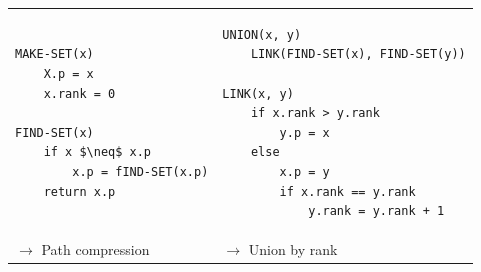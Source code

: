 \begin{center}
\begin{tabular}{m{7cm}m{7cm}}
    \begin{lstlisting}[mathescape]
MAKE-SET(x)
    X.p = x
    x.rank = 0

FIND-SET(x)
    if x $\neq$ x.p
        x.p = fIND-SET(x.p)
    return x.p
    \end{lstlisting}
    &
    \begin{lstlisting}[mathescape]
UNION(x, y)
    LINK(FIND-SET(x), FIND-SET(y))

LINK(x, y)
    if x.rank > y.rank
        y.p = x
    else 
        x.p = y
        if x.rank == y.rank
            y.rank = y.rank + 1
    \end{lstlisting}\\
    $\rightarrow$ Path compression
    & 
    $\rightarrow$ Union by rank
\end{tabular}
\end{center}


